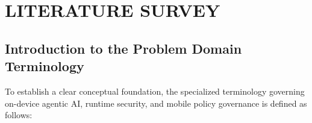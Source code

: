 \chapter{LITERATURE SURVEY}

\section{Introduction to the Problem Domain Terminology}

To establish a clear conceptual foundation, the specialized terminology governing on-device agentic AI, runtime security, and mobile policy governance is defined as follows:

